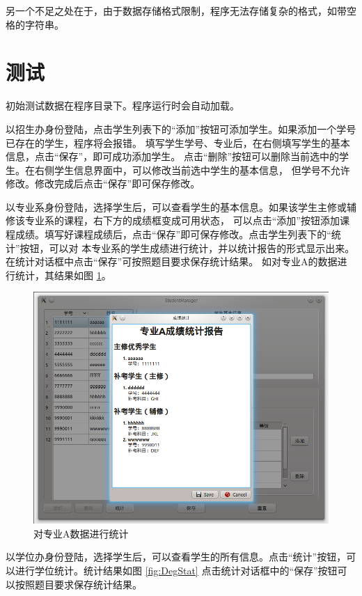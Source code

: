 \documentclass[adobefonts,a4paper]{ctexart}
\begin{document}
另一个不足之处在于，由于数据存储格式限制，程序无法存储复杂的格式，如带空格的字符串。


\section{测试}
初始测试数据在程序目录下。程序运行时会自动加载。

以招生办身份登陆，点击学生列表下的``添加''按钮可添加学生。如果添加一个学号已存在的学生，程序将会报错。
填写学生学号、专业后，在右侧填写学生的基本信息，点击``保存''，即可成功添加学生。
点击``删除''按钮可以删除当前选中的学生。在右侧学生信息界面中，可以修改当前选中学生的基本信息，
但学号不允许修改。修改完成后点击``保存''即可保存修改。

以专业系身份登陆，选择学生后，可以查看学生的基本信息。如果该学生主修或辅修该专业系的课程，右下方的成绩框变成可用状态，
可以点击``添加''按钮添加课程成绩。填写好课程成绩后，点击``保存''即可保存修改。点击学生列表下的``统计''按钮，可以对
本专业系的学生成绩进行统计，并以统计报告的形式显示出来。在统计对话框中点击``保存''可按照题目要求保存统计结果。
如对专业A的数据进行统计，其结果如图 \ref{fig:FacAStat}。

\begin{figure}[htbp]
 \centering
 \includegraphics[scale=0.5]{FacAStat}
 \caption{对专业A数据进行统计} \label{fig:FacAStat}
\end{figure}

以学位办身份登陆，选择学生后，可以查看学生的所有信息。点击``统计''按钮，可以进行学位统计。统计结果如图 \ref{fig:DegStat}
点击统计对话框中的``保存''按钮可以按照题目要求保存统计结果。
\end{document}
